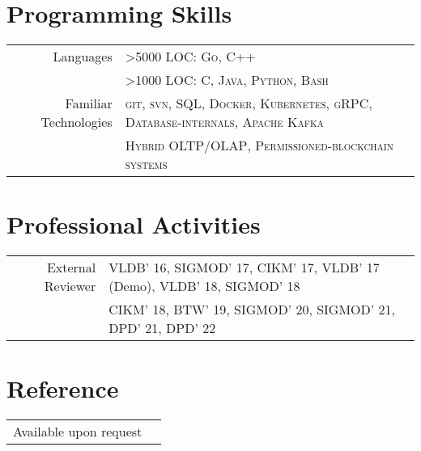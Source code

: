 \documentclass[a4paper,10pt]{article} %
\begin{document}
\section{Programming Skills}
\vspace*{0.2cm}
\begin{tabular}{rl}
Languages & >5000 LOC: \textsc{Go}, \textsc{C++}\\
		  & >1000 LOC: \textsc{C}, \textsc{Java}, \textsc{Python}, \textsc{Bash}\\
		  
Familiar Technologies & \textsc{git},  \textsc{svn},  \textsc{SQL},  \textsc{Docker},  \textsc{Kubernetes}, \textsc{gRPC}, \textsc{Database-internals}, \textsc{Apache Kafka}\\
& \textsc{Hybrid OLTP/OLAP}, \textsc{Permissioned-blockchain systems}
\end{tabular}

\section{Professional Activities}
\vspace*{0.2cm}
\begin{tabular}{rl}
External Reviewer & VLDB' 16, SIGMOD' 17, CIKM' 17, VLDB' 17 (Demo), VLDB' 18, SIGMOD' 18 \\
& CIKM' 18, BTW' 19, SIGMOD' 20, SIGMOD' 21, DPD' 21, DPD' 22
\end{tabular}

\section{Reference}
\vspace*{0.2cm}
\begin{tabular}{rl}
	Available upon request\\
\end{tabular}
\end{document}
